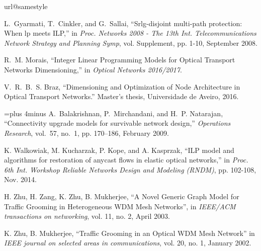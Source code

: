 \begin{thebibliography}{10}
\providecommand{\url}[1]{#1}
\csname url@samestyle\endcsname
\providecommand{\newblock}{\relax}
\providecommand{\bibinfo}[2]{#2}
\providecommand{\BIBentrySTDinterwordspacing}{\spaceskip=0pt\relax}
\providecommand{\BIBentryALTinterwordstretchfactor}{4}
\providecommand{\BIBentryALTinterwordspacing}{\spaceskip=\fontdimen2\font plus
\BIBentryALTinterwordstretchfactor\fontdimen3\font minus
  \fontdimen4\font\relax}
\providecommand{\BIBforeignlanguage}[2]{{%
\expandafter\ifx\csname l@#1\endcsname\relax
\typeout{** WARNING: IEEEtran.bst: No hyphenation pattern has been}%
\typeout{** loaded for the language `#1'. Using the pattern for}%
\typeout{** the default language instead.}%
\else
\language=\csname l@#1\endcsname
\fi
#2}}
\providecommand{\BIBdecl}{\relax}
\BIBdecl

L.~Gyarmati, T.~Cinkler, and G.~Sallai, ``Srlg-disjoint multi-path protection: When lp meets ILP,'' in \emph{Proc. Networks 2008 - The 13th Int. Telecommunications Network Strategy and Planning Symp}, vol. Supplement, pp. 1-10, September 2008.

R.~M. Morais, ``Integer Linear Programming Models for Optical Transport Networks Dimensioning,'' in \emph{Optical Networks 2016/2017}.

V.~R.~B.~S. Braz, ``Dimensioning and Optimization of Node Architecture in Optical Transport Networks.'' Master's thesis, Universidade de Aveiro, 2016.

\BIBentryALTinterwordspacing
A.~Balakrishnan, P.~Mirchandani, and H.~P. Natarajan, ``Connectivity upgrade models for survivable network design,'' \emph{Operations Research}, vol.~57, no.~1, pp. 170--186, February 2009.

K. Walkowiak, M. Kucharzak, P. Kope, and A. Kasprzak, ``ILP model and algorithms for restoration of anycast flows in elastic optical networks,'' in \emph{Proc. 6th Int. Workshop Reliable Networks Design and Modeling (RNDM)}, pp. 102-108, Nov. 2014.

H. Zhu, H. Zang, K. Zhu, B. Mukherjee, ``A Novel Generic Graph Model for Traffic Grooming in Heterogeneous WDM Mesh Networks'', in \emph{IEEE/ACM transactions on networking}, vol. 11, no. 2, April 2003.

K. Zhu, B. Mukherjee, ``Traffic Grooming in an Optical WDM Mesh Network'' in \emph{IEEE journal on selected areas in communications}, vol. 20, no. 1, January 2002.

\end{thebibliography}
